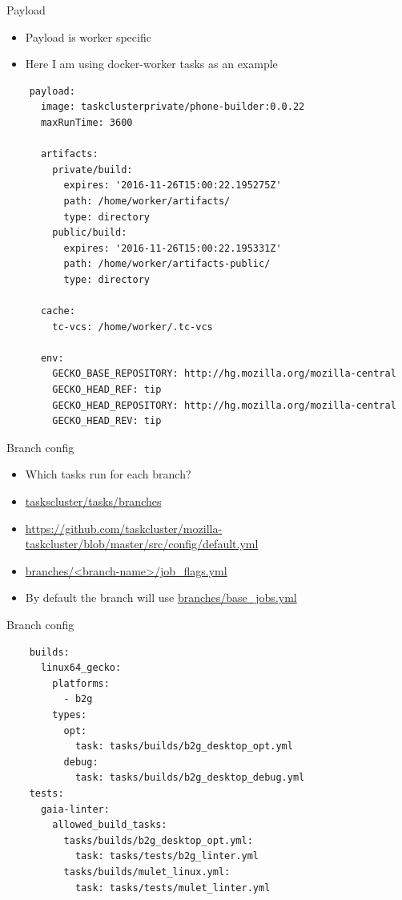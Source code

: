 \documentclass[pdf]{beamer}
\begin{document}
\begin{frame}[fragile]{Payload}
  \footnotesize
  \begin{itemize}
    \item Payload is worker specific
    \item Here I am using docker-worker tasks as an example
  \end{itemize}
  \tiny
  \begin{lstlisting}
    payload:
      image: taskclusterprivate/phone-builder:0.0.22
      maxRunTime: 3600

      artifacts:
        private/build:
          expires: '2016-11-26T15:00:22.195275Z'
          path: /home/worker/artifacts/
          type: directory
        public/build:
          expires: '2016-11-26T15:00:22.195331Z'
          path: /home/worker/artifacts-public/
          type: directory

      cache:
        tc-vcs: /home/worker/.tc-vcs

      env:
        GECKO_BASE_REPOSITORY: http://hg.mozilla.org/mozilla-central
        GECKO_HEAD_REF: tip
        GECKO_HEAD_REPOSITORY: http://hg.mozilla.org/mozilla-central
        GECKO_HEAD_REV: tip
  \end{lstlisting}
\end{frame}

\begin{frame}{Branch config}
  \begin{itemize}
    \item Which tasks run for each branch?
    \item \url{taskscluster/tasks/branches}
    \item \url{https://github.com/taskcluster/mozilla-taskcluster/blob/master/src/config/default.yml}
    \item \url{branches/<branch-name>/job_flags.yml}
    \item By default the branch will use \url{branches/base_jobs.yml}
  \end{itemize}
\end{frame}

\begin{frame}[fragile]{Branch config}
  \scriptsize
  \begin{lstlisting}
    builds:
      linux64_gecko:
        platforms:
          - b2g
        types:
          opt:
            task: tasks/builds/b2g_desktop_opt.yml
          debug:
            task: tasks/builds/b2g_desktop_debug.yml
    tests:
      gaia-linter:
        allowed_build_tasks:
          tasks/builds/b2g_desktop_opt.yml:
            task: tasks/tests/b2g_linter.yml
          tasks/builds/mulet_linux.yml:
            task: tasks/tests/mulet_linter.yml
  \end{lstlisting}
\end{frame}
\end{document}
